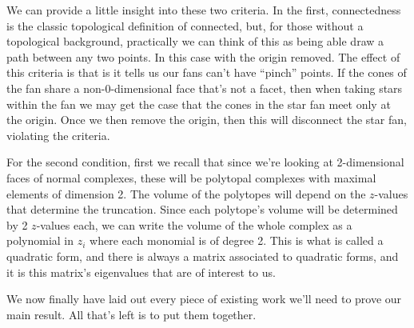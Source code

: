 \documentclass[12pt,oneside]{../../sfsuthesis}
\begin{document}
We can provide a little insight into these two criteria.
In the first, connectedness is the classic topological definition of connected, but, for those without a topological background, practically we can think of this as being able draw a path between any two points.
In this case with the origin removed.
The effect of this criteria is that is it tells us our fans can't have ``pinch'' points.
If the cones of the fan share a non-0-dimensional face that's not a facet, then when taking stars within the fan we may get the case that the cones in the star fan meet only at the origin.
Once we then remove the origin, then this will disconnect the star fan, violating the criteria.

For the second condition, first we recall that since we're looking at 2-dimensional faces of normal complexes, these will be polytopal complexes with maximal elements of dimension 2.
The volume of the polytopes will depend on the \( z \)-values that determine the truncation.
Since each polytope's volume will be determined by 2 \( z \)-values each, we can write the volume of the whole complex as a polynomial in \(z_i\) where each monomial is of degree 2.
This is what is called a quadratic form, and there is always a matrix associated to quadratic forms, and it is this matrix's eigenvalues that are of interest to us.

We now finally have laid out every piece of existing work we'll need to prove our main result.
All that's left is to put them together.
\end{document}
